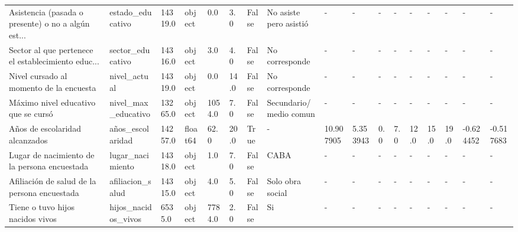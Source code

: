 \documentclass[a4paper]{article}
\begin{document}
\begin{landscape}
{\begin{tabular}{lllllllllllllllll}
        Asistencia (pasada o presente) o no a algún est... &             estado\_educativo &  14319.0 &   object &     0.0 &     3.0 &   False &         No asiste pero asistió &             - &             - &    - &        - &        - &        - &          - &          - &           - \\
        Sector al que pertenece el establecimiento educ... &             sector\_educativo &  14316.0 &   object &     3.0 &     4.0 &   False &                 No corresponde &             - &             - &    - &        - &        - &        - &          - &          - &           - \\
        Nivel cursado al momento de la encuesta            &                 nivel\_actual &  14319.0 &   object &     0.0 &    14.0 &   False &                 No corresponde &             - &             - &    - &        - &        - &        - &          - &          - &           - \\
        Máximo nivel educativo que se cursó                &          nivel\_max\_educativo &  13265.0 &   object &  1054.0 &     7.0 &   False &         Secundario/medio comun &             - &             - &    - &        - &        - &        - &          - &          - &           - \\
        Años de escolaridad alcanzados                     &             años\_escolaridad &  14257.0 &  float64 &    62.0 &    20.0 &    True &                              - &     10.907905 &      5.353943 &  0.0 &      7.0 &     12.0 &     15.0 &       19.0 &  -0.624452 &   -0.517683 \\
        Lugar de nacimiento de la persona encuestada       &             lugar\_nacimiento &  14318.0 &   object &     1.0 &     7.0 &   False &                           CABA &             - &             - &    - &        - &        - &        - &          - &          - &           - \\
        Afiliación de salud de la persona encuestada       &             afiliacion\_salud &  14315.0 &   object &     4.0 &     5.0 &   False &               Solo obra social &             - &             - &    - &        - &        - &        - &          - &          - &           - \\
        Tiene o tuvo hijos nacidos vivos                   &          hijos\_nacidos\_vivos &   6535.0 &   object &  7784.0 &     2.0 &   False &                             Si &             - &             - &    - &        - &        - &        - &          - &          - &           - \\

\end{tabular}}
\end{landscape}
\end{document}
